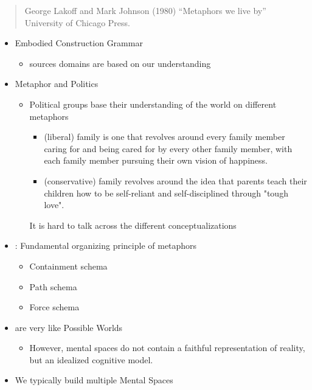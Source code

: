 \documentclass[headrule,footrule]{foils}
\begin{document}
\begin{quote}
  George Lakoff and Mark Johnson (1980) “Metaphors we live by”
  University of Chicago Press.
\end{quote}


\begin{itemize}
\item Embodied Construction Grammar
  \begin{itemize}
  \item  sources domains are based on our understanding
  \end{itemize}
\item Metaphor and Politics
  \begin{itemize}
\item Political groups base their
  understanding of the world on different metaphors
  \begin{itemize}
  \item {} (liberal) family is one that revolves
    around every family member caring for and being cared for by every
    other family member, with each family member pursuing their own vision of
    happiness.
  \item {} (conservative) family revolves around the idea that parents teach their children how to be self-reliant and self-disciplined through "tough love". 
  \end{itemize}
  It is hard to talk across the different conceptualizations
\end{itemize}
\end{itemize}

\begin{itemize}
\item {}: Fundamental organizing principle of
  metaphors
  \begin{itemize}
  \item Containment schema
  \item Path schema
  \item Force schema
  \end{itemize}
\item {} are very like Possible Worlds
  \begin{itemize}
  \item However, mental spaces do not contain a faithful
    representation of reality, but an idealized cognitive model.
  \end{itemize}
\item We typically build multiple Mental Spaces
  \begin{exe}
    \ex {}
  \end{exe}
\end{itemize}
\end{document}
